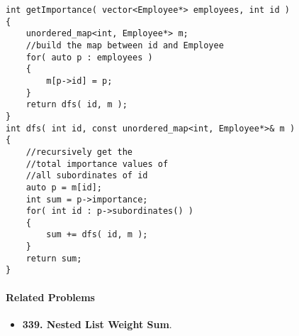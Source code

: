 \setcounter{lstlisting}{0}
\begin{lstlisting}[style=customc, caption={DFS}]
int getImportance( vector<Employee*> employees, int id )
{
    unordered_map<int, Employee*> m;
    //build the map between id and Employee
    for( auto p : employees )
    {
        m[p->id] = p;
    }
    return dfs( id, m );
}
int dfs( int id, const unordered_map<int, Employee*>& m )
{
    //recursively get the
    //total importance values of
    //all subordinates of id
    auto p = m[id];
    int sum = p->importance;
    for( int id : p->subordinates() )
    {
        sum += dfs( id, m );
    }
    return sum;
}
\end{lstlisting}

\paragraph{Related Problems}
\begin{itemize}
\item \textbf{339. Nested List Weight Sum}.
\end{itemize}